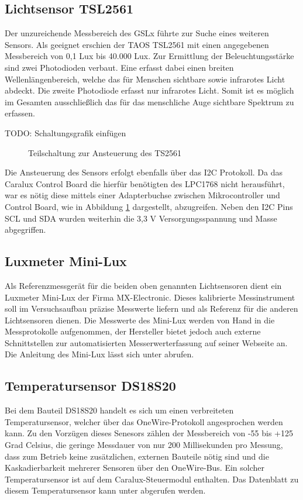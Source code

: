 \documentclass[a4paper,12pt]{scrartcl}
\begin{document}
\subsection{Lichtsensor TSL2561}

Der unzureichende Messbereich des GSLx führte zur Suche eines weiteren Sensors. Als geeignet erschien der TAOS TSL2561 mit einen angegebenen Messbereich von 0,1 Lux bis 40.000 Lux. Zur Ermittlung der Beleuchtungsstärke sind zwei Photodioden verbaut. Eine erfasst dabei einen breiten Wellenlängenbereich, welche das für Menschen sichtbare sowie infrarotes Licht abdeckt. Die zweite Photodiode erfasst nur infrarotes Licht. Somit ist es möglich im Gesamten ausschließlich das für das menschliche Auge sichtbare Spektrum zu erfassen.

TODO: Schaltungsgrafik einfügen

\begin{figure}[htb]
\begin{center}
\end{center}
\caption[Teilschaltung zur Ansteuerung des TS2561, Quelle: Autoren]{\label{fig:schaltungTSL}Teilschaltung zur Ansteuerung des TS2561}
\end{figure}

Die Ansteuerung des Sensors erfolgt ebenfalls über das I2C Protokoll. Da das Caralux Control Board die hierfür benötigten des LPC1768 nicht herausführt, war es nötig diese mittels einer Adapterbuchse zwischen Mikrocontroller und Control Board, wie in Abbildung \ref{fig:schaltungTSL} dargestellt, abzugreifen. Neben den I2C Pins SCL und SDA wurden weiterhin die 3,3 V Versorgungsspannung und Masse abgegriffen.

\subsection{Luxmeter Mini-Lux}
Als Referenzmessgerät für die beiden oben genannten Lichtsensoren dient ein Luxmeter Mini-Lux der Firma MX-Electronic. Dieses kalibrierte Messinstrument soll
im Versuchsaufbau präzise Messwerte liefern und als Referenz für die anderen Lichtsensoren dienen. Die Messwerte des Mini-Lux werden von Hand in die
Messprotokolle aufgenommen, der Hersteller bietet jedoch auch externe Schnittstellen zur automatisierten Messerwerterfassung auf seiner Webseite an. Die
Anleitung des Mini-Lux lässt sich unter \cite{specminilux} abrufen. 

\subsection{Temperatursensor DS18S20}
Bei dem Bauteil DS18S20 handelt es sich um einen verbreiteten Temperatursensor,
welcher über das OneWire-Protokoll angesprochen werden kann. Zu den Vorzügen
dieses Senesors zählen der Messbereich von -55 bis +125 Grad Celsius, die
geringe Messdauer von nur 200 Millisekunden pro Messung, dass zum Betrieb keine
zusätzlichen, externen Bauteile nötig sind und die Kaskadierbarkeit mehrerer
Sensoren über den OneWire-Bus. Ein solcher Temperatursensor ist auf dem
Caralux-Steuermodul enthalten. Das Datenblatt zu diesem Temperatursensor kann
unter \cite{specds1820} abgerufen werden.
\end{document}
